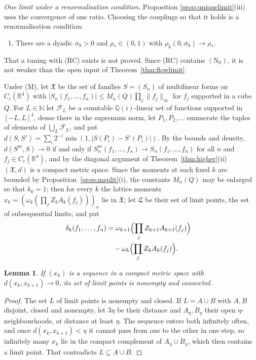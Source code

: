 \documentclass[aps,prd,twocolumn,superscriptaddress,nofootinbib,longbibliography,floatfix,amsmath,amssymb,10pt]{revtex4-2}
\newtheorem{lemma}[theorem]{Lemma}
\theoremstyle{definition}
\theoremstyle{remark}
\newcommand{\R}{\mathbb{R}}
\begin{document}
\emph{One limit under a renormalisation condition.} Proposition
\ref{prop:uniquelimit}(iii) uses the convergence of one ratio. Choosing the
couplings so that it holds is a renormalisation condition:
\begin{enumerate}[label=\textup{(RC)},leftmargin=*]
\item There are a dyadic $\sigma_0>0$ and $\rho_*\in(0,1)$ with
$\rho_k(0,\sigma_0)\to\rho_*$.
\end{enumerate}
That a tuning with (RC) exists is not proved. Since (RC) contains
$(\mathrm N_0)$, it is not weaker than the open input of
Theorem~\ref{thm:flowlimit}.

Under (M), let $\mathfrak X$ be the set of families $S=(S_n)$ of
multilinear forms on $C_c(\R^4)$ with $|S_n(f_1,\dots,f_n)|\le M_n(Q)
\prod_j\|f_j\|_\infty$ for $f_j$ supported in a cube $Q$. For $L\in\mathbb
N$ let $\mathcal F_L$ be a countable $\mathbb Q(i)$-linear set of
functions supported in $[-L,L]^4$, dense there in the supremum norm, let
$P_1,P_2,\dots$ enumerate the tuples of elements of
$\bigcup_L\mathcal F_L$, and put $d(S,S')=\sum_i2^{-i}\min(1,|S(P_i)-
S'(P_i)|)$. By the bounds and density, $d(S^m,S)\to0$ if and only if
$S^m_n(f_1,\dots,f_n)\to S_n(f_1,\dots,f_n)$ for all $n$ and $f_j\in
C_c(\R^4)$, and by the diagonal argument of Theorem~\ref{thm:higher}(ii)
$(\mathfrak X,d)$ is a compact metric space. Since the moments at each fixed $k$ are bounded by Proposition~\ref{prop:msplit}(i), the constants $M_n(Q)$ may be enlarged so that $k_0=1$; then for every $k$ the lattice
moments $x_k=(\omega_k(\prod_jZ_kA_k(f_j)))_n$ lie in $\mathfrak X$; let
$\mathfrak L$ be their set of limit points, the set of subsequential
limits, and put
\[
\begin{split}
\delta_k(f_1,\dots,f_n)&=\omega_{k+1}\Bigl(\prod_jZ_{k+1}A_{k+1}(f_j)
\Bigr)\\
&\quad-\omega_k\Bigl(\prod_jZ_kA_k(f_j)\Bigr).
\end{split}
\]

\begin{lemma}\label{lem:limitset}
If $(x_k)$ is a sequence in a compact metric space with
$d(x_k,x_{k+1})\to0$, its set of limit points is nonempty and connected.
\end{lemma}

\begin{proof}
The set $L$ of limit points is nonempty and closed. If $L=A\cup B$ with
$A,B$ disjoint, closed and nonempty, let $3\eta$ be their distance and
$A_\eta,B_\eta$ their open $\eta$-neighbourhoods, at distance at least
$\eta$. The sequence enters both infinitely often, and once
$d(x_k,x_{k+1})<\eta$ it cannot pass from one to the other in one step, so
infinitely many $x_k$ lie in the compact complement of $A_\eta\cup
B_\eta$, which then contains a limit point. That contradicts $L\subseteq
A\cup B$.
\end{proof}
\end{document}
